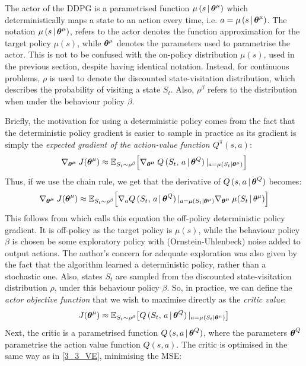 The actor of the DDPG is a parametrised function $\mu\,(s\,|\, \boldsymbol{\theta}^\mu)$ which deterministically maps a state to an action every time, i.e. $a = \mu\,(s\,|\, \boldsymbol{\theta}^\mu)$. The notation $\mu\,(s\,|\, \boldsymbol{\theta}^\mu)$, refers to the actor denotes the function approximation for the target policy $\mu(s)$, while $\boldsymbol{\theta}^\mu$ denotes the parameters used to parametrise the actor. This is not to be confused with the on-policy distribution $\mu(s)$, used in the previous section, despite having identical notation. Instead, for continuous problems, $\rho$ is used to denote the discounted state-visitation distribution, which describes the probability of visiting a state $S_t$. Also, $\rho^\beta$ refers to the distribution when under the behaviour policy $\beta$.

Briefly, the motivation for using a deterministic policy comes from the fact that the deterministic policy gradient is easier to sample in practice as its gradient is simply the \textit{expected gradient of the action-value function $Q^\pi(s,a)$}:
\begin{equation}
    \nabla_{\boldsymbol{\theta^\mu}} \: J(\boldsymbol{\theta}^\mu)\approx  \mathbb{E}_{S_t \sim \rho^\beta} \Big[ 
    \nabla_{\boldsymbol{\theta^\mu}} \: Q\,(S_t,\, a\,|\, \boldsymbol{\theta}^Q) \,|_{a=\mu(S_t|\boldsymbol{\theta}^\mu)}
    \Big]
\end{equation}
Thus, if we use the chain rule, we get that the derivative of $Q\,(s,a \,|\, \boldsymbol{\theta}^Q)$ becomes: 
\begin{equation}
    \nabla_{\boldsymbol{\theta^\mu}} \: J(\boldsymbol{\theta}^\mu) \approx \mathbb{E}_{S_t \sim \rho^\beta} \Big[ 
    \nabla_a Q\,(S_t,\, a \,|\, \boldsymbol{\theta}^Q) \,|_{a=\mu(S_t|\boldsymbol{\theta}^\mu)} \nabla_{\boldsymbol{\theta^\mu}} \: \mu(S_t\,|\,\theta^\mu)
    \Big] \label{3_4_actorGrad}
\end{equation}
This follows from \cite{DPG} which calls this equation the off-policy deterministic policy gradient. It is off-policy as the target policy is $\mu(s)$, while the behaviour policy $\beta$ is chosen be some exploratory policy with (Ornstein-Uhlenbeck) noise added to output actions. The author's concern for adequate exploration was also given by the fact that the algorithm learned a deterministic policy, rather than a stochastic one. 
Also, states $S_t$ are sampled from the discounted state-visitation distribution $\rho$, under this behaviour policy $\beta$. So, in practice, we can define the \textit{actor objective function} that we wish to maximise directly as the \textit{critic value}:
\begin{equation}
    J(\boldsymbol{\theta}^\mu) \approx \mathbb{E}_{S_t \sim \rho^\beta} \big[
    Q\,(S_t,\, a\,|\, \boldsymbol{\theta}^Q) \,|_{a=\mu(S_t|\boldsymbol{\theta}^\mu)} 
    \big]
    \label{3_4_actorLoss}
\end{equation}
Next, the critic is a parametrised function $Q\,(s,a \,|\, \boldsymbol{\theta}^Q)$, where the parameters $\boldsymbol{\theta}^Q$ parametrise the action value function $Q(s,a)$. The critic is optimised in the same way as in \eqref{3_3_VE}, minimising the MSE:
